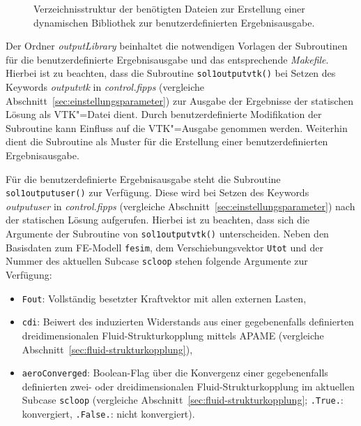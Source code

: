 \documentclass[11pt,titlepage,listof=totoc,bibliography=totoc,twoside]{scrreprt}
\begin{document}
{{\begin{figure}[htb]
\caption{Verzeichnisstruktur der benötigten Dateien zur Erstellung einer dynamischen Bibliothek zur benutzerdefinierten Ergebnisausgabe.}
\label{fig:dirtree_libuseroutput}
\end{figure}

Der Ordner \emph{outputLibrary} beinhaltet die notwendigen Vorlagen der Subroutinen für die benutzerdefinierte Ergebnisausgabe und das entsprechende \emph{Makefile}. Hierbei ist zu beachten, dass die Subroutine \texttt{sol1\textunderscore output\textunderscore vtk()} bei Setzen des Keywords \emph{outputvtk} in \emph{control.fipps} (vergleiche Abschnitt~\ref{sec:einstellungsparameter}) zur Ausgabe der Ergebnisse der statischen Lösung als VTK"=Datei dient. Durch benutzerdefinierte Modifikation der Subroutine kann Einfluss auf die VTK"=Ausgabe genommen werden. Weiterhin dient die Subroutine als Muster für die Erstellung einer benutzerdefinierten Ergebnisausgabe.

Für die benutzerdefinierte Ergebnisausgabe steht die Subroutine \texttt{sol1\textunderscore output\textunderscore user()} zur Verfügung. Diese wird bei Setzen des Keywords \emph{outputuser} in \emph{control.fipps} (vergleiche Abschnitt~\ref{sec:einstellungsparameter}) nach der statischen Lösung aufgerufen. Hierbei ist zu beachten, dass sich die Argumente der Subroutine von \texttt{sol1\textunderscore output\textunderscore vtk()} unterscheiden. Neben den Basisdaten zum FE-Modell \texttt{fesim}, dem Verschiebungsvektor \texttt{Utot} und der Nummer des aktuellen Subcase \texttt{scloop} stehen folgende Argumente zur Verfügung:

\begin{itemize}
  \item \texttt{Fout}: Vollständig besetzter Kraftvektor mit allen externen Lasten,
  \item \texttt{cdi}: Beiwert des induzierten Widerstands aus einer gegebenenfalls definierten dreidimensionalen Fluid-Strukturkopplung mittels APAME (vergleiche Abschnitt~\ref{sec:fluid-strukturkopplung}),
  \item \texttt{aeroConverged}: Boolean-Flag über die Konvergenz einer gegebenenfalls definierten zwei- oder dreidimensionalen Fluid-Strukturkopplung im aktuellen Subcase \texttt{scloop} (vergleiche Abschnitt~\ref{sec:fluid-strukturkopplung}; \texttt{.True.}: konvergiert, \texttt{.False.}: nicht konvergiert).
\end{itemize}

}}
\end{document}
